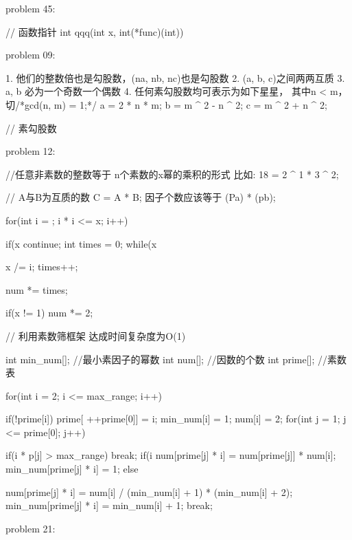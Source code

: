 

problem 45:

// 函数指针    int qqq(int x, int(*func)(int))



problem 09:

1. 他们的整数倍也是勾股数，(na, nb, nc)也是勾股数
2. (a, b, c)之间两两互质
3.  a, b 必为一个奇数一个偶数
4. 任何素勾股数均可表示为如下星星， 其中n < m， 切/*gcd(n, m) = 1;*/
    a = 2 * n * m;
    b = m ^ 2 - n ^ 2;
    c = m ^ 2 + n ^ 2;



// 素勾股数



problem 12:

//任意非素数的整数等于 n个素数的x幂的乘积的形式   比如: 18 = 2 ^ 1 * 3 ^ 2;

// A与B为互质的数 C = A * B;   因子个数应该等于 (Pa) * (pb);


for(int i = ; i * i <= x; i++)
{

	if(x %
	continue;
	int times = 0;
	while(x %
	{
		x /= i;
		times++;
		
	}
	num *= times;
}
	if(x != 1)
	num *= 2;
	
	//  利用素数筛框架 达成时间复杂度为O(1)
	
int min_num[];  //最小素因子的幂数
int num[];    //因数的个数
int prime[];   //素数表


for(int i = 2; i <= max_range; i++)
{
	if(!prime[i])
	{
		prime[ ++prime[0]] = i;
		min_num[i] = 1;
		num[i] = 2;
	}
	for(int j = 1; j <= prime[0]; j++)
	{
		if(i * p[j] > max_range)
		break;
		if(i %
		{
			num[prime[j] * i] = num[prime[j]] * num[i];
			min_num[prime[j] * i] = 1;
		}
		else
		
		{
			num[prime[j] * i] = num[i] / (min_num[i] + 1) * (min_num[i] + 2);
			min_num[prime[j] * i] = min_num[i] + 1;
			break;
			
		}
	}
}


problem 21:




